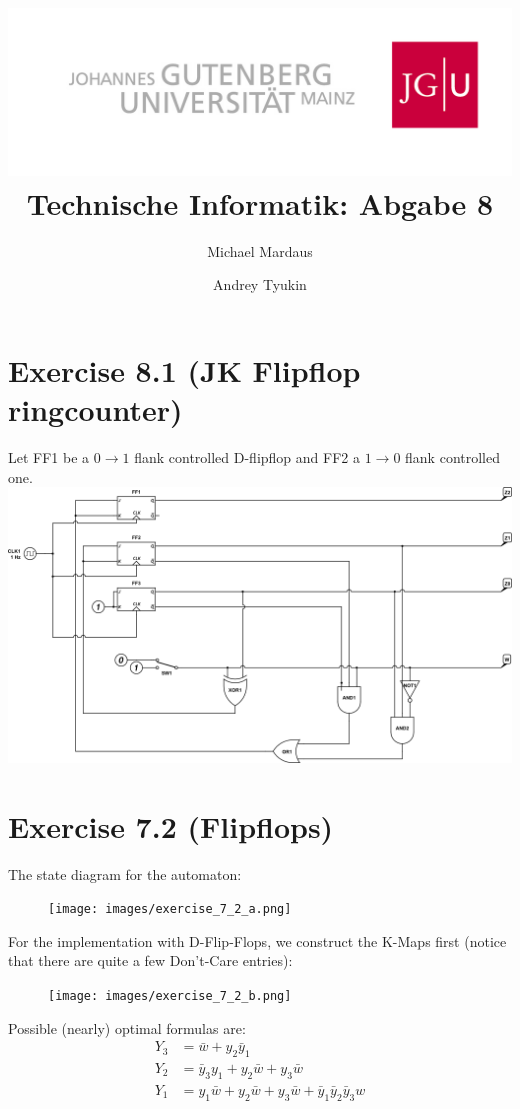 \documentclass[10pt,a4paper]{scrartcl}
\author{Michael Mardaus \and Andrey Tyukin}
\title{\includegraphics[scale=0.2]{../logo_schriftzug}\\
Technische Informatik: Abgabe 8}
\newcommand{\subExercise}[1]{\vspace{0.5em} \noindent{\bf #1)}}
\begin{document}
\maketitle

\section*{Exercise 8.1 (JK Flipflop ringcounter)}
Let FF1 be a $0\rightarrow 1$ flank controlled D-flipflop and FF2 a $1\rightarrow0$ flank controlled one.\\
\includegraphics[width=\textwidth]{images/8_1-ringcounter-jk.png} 

\FloatBarrier
\section*{Exercise 7.2 (Flipflops)}

\subExercise{a} The state diagram for the automaton:

\begin{figure}[h]
  \texttt{[image: images/exercise\_7\_2\_a.png]}
\end{figure}

\subExercise{b} For the implementation with D-Flip-Flops, we construct the K-Maps first
(notice that there are quite a few Don't-Care entries):
\begin{figure}[h]
  \texttt{[image: images/exercise\_7\_2\_b.png]}
\end{figure}

\noindent Possible (nearly) optimal formulas are:
\begin{align*}
  Y_3 &= \bar w + y_2 \bar y_1 \\
  Y_2 &= \bar y_3 y_1 + y_2 \bar w + y_3 \bar w \\
  Y_1 &= y_1 \bar w + y_2 \bar w + y_3 \bar w + \bar y_1 \bar y_2 \bar y_3 w
\end{align*}
\end{document}
